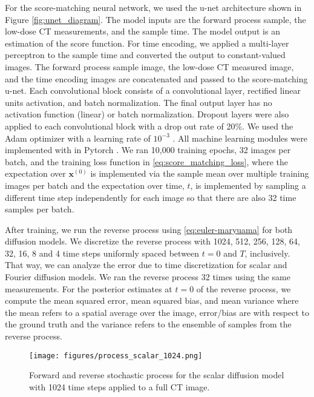 \documentclass[12pt,]{article}
\begin{document}
For the score-matching neural network, we used the u-net architecture shown in Figure \ref{fig:unet_diagram}. The model inputs are the forward process sample, the low-dose CT measurements, and the sample time. The model output is an estimation of the score function. For time encoding, we applied a multi-layer perceptron to the sample time and converted the output to constant-valued images. The forward process sample image, the low-dose CT measured image, and the time encoding images are concatenated and passed to the score-matching u-net. Each convolutional block consists of a convolutional layer, rectified linear units activation, and batch normalization. The final output layer has no activation function (linear) or batch normalization. Dropout layers were also applied to each convolutional block with a drop out rate of 20\%.  We used the Adam optimizer with a learning rate of $10^{-3}$ \cite{kingma2014adam}. All machine learning modules were implemented with in Pytorch \cite{NEURIPS2019_9015}. We ran 10,000 training epochs, 32 images per batch, and the training loss function in \eqref{eq:score_matching_loss}, where the expectation over $\mathbf{x}^{(0)}$ is implemented via the sample mean over multiple training images per batch and the expectation over time, $t$, is implemented by sampling a different time step independently for each image so that there are also 32 time samples per batch.

After training, we run the reverse process using \eqref{eq:euler-maryuama} for both diffusion models. We discretize the reverse process with 1024, 512, 256, 128, 64, 32, 16, 8 and 4 time steps uniformly spaced between $t=0$ and $T$, inclusively. That way, we can analyze the error due to time discretization for scalar and Fourier diffusion models. We ran the reverse process 32 times using the same measurements. For the posterior estimates at $t=0$ of the reverse process, we compute the mean squared error, mean squared bias, and mean variance where the mean refers to a spatial average over the image, error/bias are with respect to the ground truth and the variance refers to the ensemble of samples from the reverse process.



\begin{figure}[ht!]
    \centering
\texttt{[image: figures/process\_scalar\_1024.png]}
    \caption{Forward and reverse stochastic process for the scalar diffusion model with 1024 time steps applied to a full CT image.  }
    \label{fig:process_scalar_1024}
\end{figure}
\end{document}
